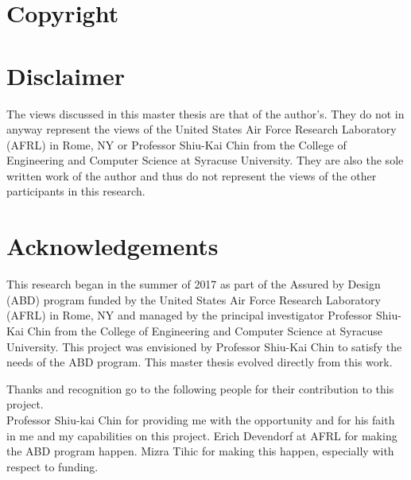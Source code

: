 \documentclass[../main/main.tex]{subfiles}
\begin{document}
\section*{Copyright}
\cleardoublepage

\section*{Disclaimer}
The views discussed in this master thesis are that of the author's.  They do not in anyway represent the views of the United States Air Force Research Laboratory (AFRL) in Rome, NY or  Professor Shiu-Kai Chin from the College of Engineering and Computer Science at Syracuse University.  They are also the sole written work of the author and thus do not represent the views of the other participants in this research.

\cleardoublepage

\section*{Acknowledgements}
This research began in the summer of 2017 as part of the Assured by Design (ABD) program funded by the United States Air Force Research Laboratory (AFRL) in Rome, NY and managed by the principal investigator Professor Shiu-Kai Chin from the College of Engineering and Computer Science at Syracuse University.  This project was envisioned by Professor Shiu-Kai Chin to satisfy the needs of the ABD program.  This master thesis evolved directly from this work.

Thanks and recognition go to the following people for their contribution to this project.\\
Professor Shiu-kai Chin for providing me with the opportunity and for his faith in me and my capabilities on this project.  Erich Devendorf at AFRL for making the ABD program happen. Mizra Tihic for making this happen, especially with respect to funding.
\end{document}
